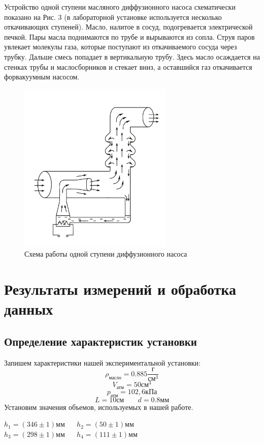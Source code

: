 \documentclass[12pt,a4paper]{article}
\begin{document}
\begin{enumerate}
Устройство одной ступени масляного диффузионного насоса схематически показано на Рис. 3 (в лабораторной установке используется несколько откачивающих ступеней). Масло, налитое в сосуд, подогревается электрической печкой. Пары масла поднимаются по трубе и вырываются из сопла. Струя паров увлекает молекулы газа, которые поступают из откачиваемого сосуда через трубку. Дальше смесь попадает в вертикальную трубу. Здесь масло осаждается на стенках трубы и маслосборников и стекает вниз, а оставшийся газ откачивается форвакуумным насосом. 


\begin{figure}[H]
\centering
	\includegraphics{2.3.1_3} 
	\caption{Схема работы одной ступени диффузионного насоса} 
\end{figure}

\newpage
\section{Результаты измерений и обработка данных}

\subsection{Определение характеристик установки}

Запишем характеристики нашей экспериментальной установки: \hfill \break
$$\rho_{\text{масло}} = 0.885\frac{\text{г}}{\text{см}^3}$$
$$V_{\text{атм}} = 50 \text{см}^3$$
$$p_{\text{атм}} = 102,6\text{кПа}$$
$$L = 10 \text{см} \;\;\;\;\;\;\; d = 0.8 \text{мм}$$
Установим значения объемов, используемых в нашей работе.

$h_{1} = (346 \pm 1)\text{мм} \;\;\;\;\;\; h_{2} = (50 \pm 1)\text{мм}$ \hfill \break
$h_{3} = (298 \pm 1)\text{мм} \;\;\;\;\;\; h_{4} = (111 \pm 1)\text{мм}$


\end{enumerate}
\end{document}
